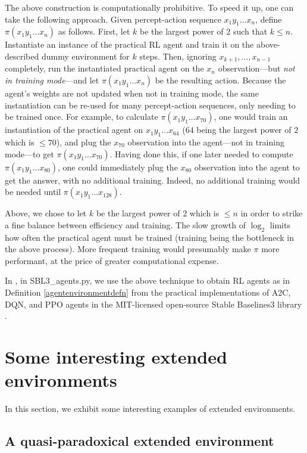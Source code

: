 \documentclass{article}
\begin{document}
The above construction is computationally prohibitive.
To speed it up, one can take the following approach.
Given percept-action sequence $x_1y_1\ldots x_n$,
define $\pi(x_1y_1\ldots x_n)$ as follows.
First, let $k$ be the largest power of $2$ such that $k\leq n$.
Instantiate an instance of the practical RL agent and train it on the
above-described dummy environment for $k$ steps.
Then, ignoring $x_{k+1},\ldots,x_{n-1}$ completely,
run the instantiated practical agent on the $x_n$ observation---but
\emph{not in training mode}---and let
$\pi(x_1y_1\ldots x_n)$ be the resulting action.
Because the agent's weights are not updated when not in training mode,
the same instantiation can be re-used for many percept-action sequences,
only needing to be trained once.
For example, to calculate $\pi(x_1y_1\ldots x_{70})$,
one would train an instantiation of the practical agent on
$x_1y_1\ldots x_{64}$ ($64$ being the largest power of $2$ which is $\leq 70$),
and plug the $x_{70}$ observation into the agent---not in training mode---to get
$\pi(x_1y_1\ldots x_{70})$.
Having done this, if one later needed to compute
$\pi(x_1y_1\ldots x_{80})$, one could immediately plug the $x_{80}$ observation into
the agent to get the answer, with no additional training. Indeed, no additional
training would be needed until $\pi(x_1y_1\ldots x_{128})$.

Above, we chose to let $k$ be the largest power of $2$ which is $\leq n$
in order to strike a fine balance between efficiency and training.
The slow growth of $\log_2$ limits how often the practical agent must be trained
(training being the bottleneck in the above process). More frequent training
would presumably make $\pi$ more performant, at the price of greater computational
expense.

In \cite{library}, in SBL3\_agents.py, we use the above technique
to obtain RL agents as in Definition \ref{agentenvironmentdefn}
from the practical implementations of A2C, DQN, and PPO
agents in the MIT-licensed open-source
Stable Baselines3 library \cite{stable-baselines3}.

\section{Some interesting extended environments}
\label{examplesection}

In this section, we exhibit some interesting examples of extended environments.

\subsection{A quasi-paradoxical extended environment}
\end{document}
